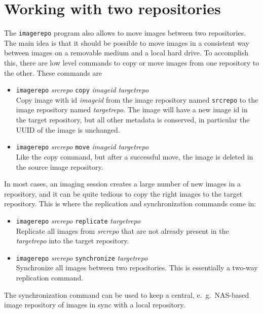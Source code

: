 \section{Working with two repositories}
The \texttt{imagerepo} program also allows to move images between
two repositories.
The main idea is that it should be possible to move images in a consistent
way between images on a removable medium and a local hard drive.
To accomplish this, there are low level commands to copy or move images
from one repository to the other.
These commands are
\begin{itemize}
\item
\texttt{imagerepo} \textit{srcrepo} \texttt{copy} \textit{imageid} \textit{targetrepo}
\\
Copy image with id \textit{imageid} from the image repository named
\texttt{srcrepo} to the image repository named \textit{targetrepo}.
The image will have a new image id in the target repository, but all
other metadata is conserved, in particular the UUID of the image is
unchanged.
\item
\texttt{imagerepo} \textit{srcrepo} \texttt{move} \textit{imageid} \textit{targetrepo}
\\
Like the copy command, but after a successful move, the image is deleted
in the source image repository.
\end{itemize}
In most cases, an imaging session creates a large number of new images
in a repository, and it can be quite tedious to copy the right images
to the target repository. 
This is where the replication and synchronization commands come in:
\begin{itemize}
\item
\texttt{imagerepo} \textit{srcrepo} \texttt{replicate} \textit{targetrepo}
\\
Replicate all images from \textit{srcrepo} that are not already present
in the \textit{targetrepo} into the target repository.
\item
\texttt{imagerepo} \textit{srcrepo} \texttt{synchronize} \textit{targetrepo}
\\
Synchronize all images between two repositories.
This is essentially a two-way replication command.
\end{itemize}
The synchronization command can be used to keep a central, e.~g.~NAS-based
image repository of images in sync with a local repository.

